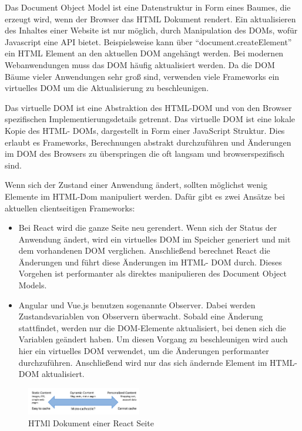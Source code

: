 \documentclass[runningheads]{llncs}
\begin{document}
Das Document Object Model ist eine Datenstruktur in Form eines Baumes, 
die erzeugt wird, wenn der Browser das HTML Dokument rendert. 
Ein aktualisieren des Inhaltes einer Website ist nur möglich, 
durch Manipulation des DOMs, wofür Javascript eine API bietet. 
Beispielsweise kann über “document.createElement” ein HTML Element 
an den aktuellen DOM angehängt werden. 
Bei modernen Webanwendungen muss das DOM häufig aktualisiert werden. 
Da die DOM Bäume vieler Anwendungen sehr groß sind, 
verwenden viele Frameworks ein virtuelles DOM um die 
Aktualisierung zu beschleunigen. 

Das virtuelle DOM ist eine Abstraktion des HTML-DOM und 
von den Browser spezifischen Implementierungsdetails getrennt. 
Das virtuelle DOM ist eine lokale Kopie des HTML- DOMs, 
dargestellt in Form einer JavaScript Struktur. 
Dies erlaubt es Frameworks, 
Berechnungen abstrakt durchzuführen und Änderungen im DOM des Browsers 
zu überspringen die oft langsam und browserspezifisch sind.

Wenn sich der Zustand einer Anwendung ändert, 
sollten möglichst wenig Elemente im HTML-Dom manipuliert werden. 
Dafür gibt es zwei Ansätze bei aktuellen clientseitigen Frameworks:

\begin{itemize}
  \item Bei React wird die ganze Seite neu gerendert. 
  Wenn sich der Status der Anwendung ändert, 
  wird ein virtuelles DOM im Speicher generiert 
  und mit dem vorhandenen DOM verglichen. 
  Anschließend berechnet React die Änderungen und führt diese 
  Änderungen im HTML- DOM durch. 
  Dieses Vorgehen ist performanter als direktes manipulieren 
  des Document Object Models.

  \item Angular und Vue.js benutzen sogenannte Observer. 
  Dabei werden  Zustandsvariablen von Observern überwacht. 
  Sobald eine Änderung stattfindet, 
  werden nur die DOM-Elemente aktualisiert, 
  bei denen sich die Variablen geändert haben. 
  Um diesen Vorgang zu beschleunigen 
  wird auch hier ein virtuelles DOM verwendet, 
  um die Änderungen performanter durchzuführen. 
  Anschließend wird nur das sich ändernde Element im HTML- DOM aktualisiert.

\end{itemize}

\begin{figure}[h]
  \centering
  \includegraphics[width=5cm]{images/caching}
  \caption{HTMl Dokument einer React Seite}
\end{figure}
\end{document}
